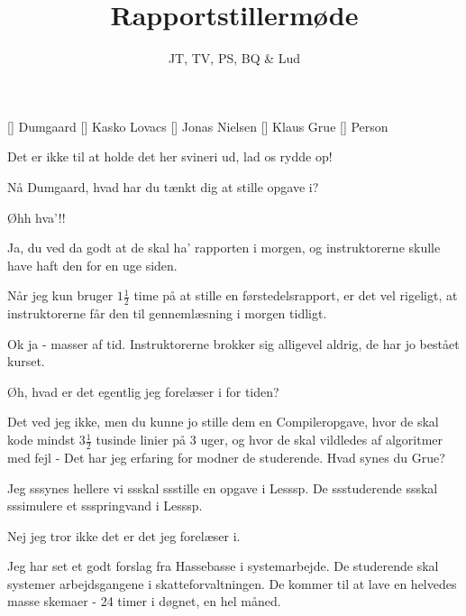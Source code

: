 \documentclass[a4paper,11pt]{article}
\title{Rapportstillermøde}
\author{JT, TV, PS, BQ \& Lud}
\begin{document}
\maketitle

\begin{roles}
[] Dumgaard
[] Kasko Lovacs
[] Jonas Nielsen
[] Klaus Grue
[] Person
\end{roles}

\begin{sketch}


     Det er ikke til at holde det her svineri ud, lad os rydde op!


      Nå Dumgaard, hvad har du tænkt dig at stille opgave i?

     Øhh hva'!!

     Ja, du ved da godt at de skal ha' rapporten i morgen, og instruktorerne skulle have haft den for en uge siden.

     Når jeg kun bruger $1\frac{1}{2}$ time på at stille en førstedelsrapport, er det vel rigeligt, at instruktorerne får den til
             gennemlæsning i morgen tidligt.
    
     Ok ja - masser af tid. Instruktorerne brokker sig alligevel aldrig, de har jo bestået kurset.

     Øh, hvad er det egentlig jeg forelæser i for tiden?

     Det ved jeg ikke, men du kunne jo stille dem en Compileropgave, hvor de skal kode mindst $3\frac{1}{2}$ tusinde linier på 3 uger,
             og hvor de skal vildledes af algoritmer med fejl - Det har jeg erfaring for modner de studerende. Hvad synes du Grue?

      Jeg sssynes hellere vi ssskal ssstille en opgave i Lesssp. De ssstuderende ssskal sssimulere et ssspringvand i Lesssp.

     Nej jeg tror ikke det er det jeg forelæser i.

     Jeg har set et godt forslag fra Hassebasse i systemarbejde. De studerende skal systemer arbejdsgangene i skatteforvaltningen.
             De kommer til at lave en helvedes masse skemaer - 24 timer i døgnet, en hel måned.


\end{sketch}
\end{document}
